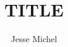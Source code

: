 \documentclass[sigconf, review, anonymous]{acmart}
\theoremstyle{definition}
\begin{document}
\title{TITLE}

\author{Jesse Michel}
\maketitle


% 
% 
% 
% 
% 
% 
% 
% 
\end{document}
